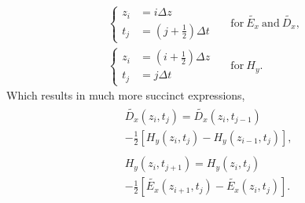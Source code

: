 \documentclass[12pt]{article}
\begin{document}
\begin{multicols}{2}
\begin{equation}
\begin{aligned}
\left\{
\begin{split}
z_i&=i\Delta z \\
t_j&=\left(j+\frac{1}{2}\right)\Delta t
\end{split}\right.~~&~\mathrm{for}~\tilde{E_x}~\mathrm{and}~\tilde{D_x}, \\
\left\{
\begin{split}
z_i&=\left(i+\frac{1}{2}\right)\Delta z \\
t_j&=j\Delta t
\end{split}\right.~~&~\mathrm{for}~H_y.
\end{aligned}
\end{equation}
Which results in much more succinct expressions,
\begin{subequations}
\begin{align}
\label{eq:third_discrete_dD_dt}\begin{split}
&\tilde{D_x}(z_i,t_{j})=\tilde{D_x}(z_i,t_{j-1}) \\
&   -\frac{1}{2}\left[H_y(z_{i},t_j)-H_y(z_{i-1},t_j)\right],
\end{split} \\
\label{eq:third_discrete_dH_dt}\begin{split}
&H_y(z_i,t_{j+1}) =H_y(z_i,t_{j}) \\
    & -\frac{1}{2}\left[\tilde{E_x}(z_{i+1},t_j)-\tilde{E_x}(z_{i},t_j)\right].
\end{split}
\end{align}
\end{subequations}


\end{multicols}
\end{document}
